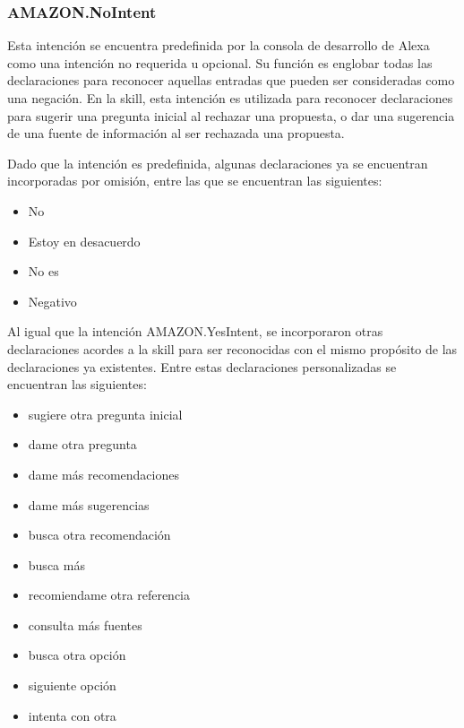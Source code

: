 \subsubsection{AMAZON.NoIntent}
\label{NoIntentcapIV}

Esta intención se encuentra predefinida por la consola de desarrollo de Alexa como una intención no requerida u opcional. Su función es englobar todas las declaraciones para reconocer aquellas entradas que pueden ser consideradas como una negación. En la skill, esta intención es utilizada para reconocer declaraciones para sugerir una pregunta inicial al rechazar una propuesta, o dar una sugerencia de una fuente de información al ser rechazada una propuesta.

Dado que la intención es predefinida, algunas declaraciones ya se encuentran incorporadas por omisión, entre las que se encuentran las siguientes:

\begin{itemize}
  \item No
  \item Estoy en desacuerdo
  \item No es
  \item Negativo
\end{itemize}

Al igual que la intención AMAZON.YesIntent, se incorporaron otras declaraciones acordes a la skill para ser reconocidas con el mismo propósito de las declaraciones ya existentes. Entre estas declaraciones personalizadas se encuentran las siguientes:

\begin{itemize}
  \item sugiere otra pregunta inicial
  \item dame otra pregunta
  \item dame más recomendaciones
  \item dame más sugerencias
  \item busca otra recomendación
  \item busca más
  \item recomiendame otra referencia
  \item consulta más fuentes
  \item busca otra opción
  \item siguiente opción
  \item intenta con otra
\end{itemize}


